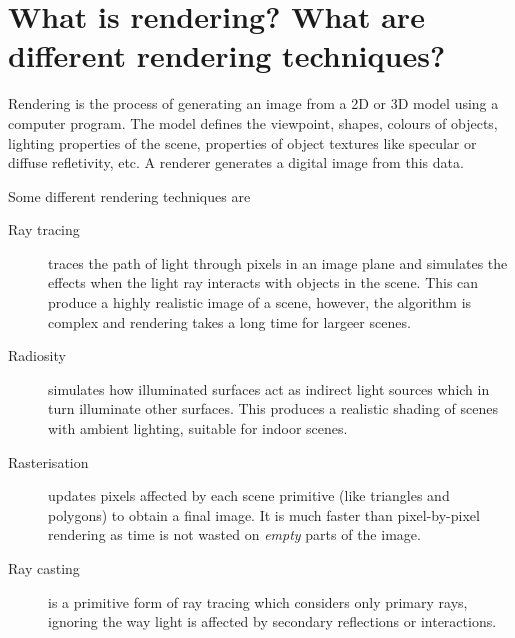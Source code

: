 \documentclass[a4paper,14pt,english,crop=false]{standalone}
\begin{document}
\section{What is rendering? What are different rendering techniques?}
Rendering is the process of generating an image from a 2D or 3D model using a
computer program. The model defines the viewpoint, shapes, colours of objects,
lighting properties of the scene, properties of object textures like specular or
diffuse refletivity, etc. A renderer generates a digital image from this data.

Some different rendering techniques are
\begin{description}
  \item [Ray tracing]traces the path of light through pixels in an image plane
    and simulates the effects when the light ray interacts with objects in the
    scene. This can produce a highly realistic image of a scene, however, the
    algorithm is complex and rendering takes a long time for largeer scenes.
  \item [Radiosity] simulates how illuminated surfaces act as indirect light
    sources which in turn illuminate other surfaces. This produces a realistic
    shading of scenes with ambient lighting, suitable for indoor scenes.
  \item [Rasterisation] updates pixels affected by each scene primitive (like
    triangles and polygons) to obtain a final image. It is much faster than
    pixel-by-pixel rendering as time is not wasted on \emph{empty} parts of the
    image.
  \item [Ray casting] is a primitive form of ray tracing which considers only
    primary rays, ignoring the way light is affected by secondary reflections or
    interactions.
\end{description}
\end{document}
